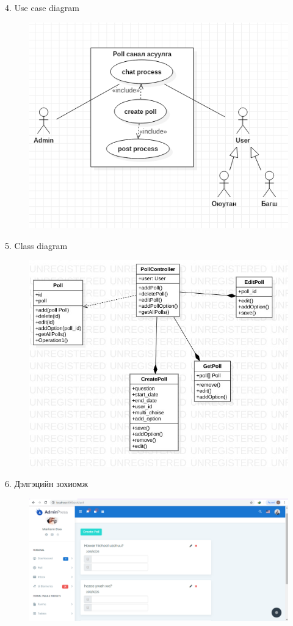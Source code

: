 \documentclass[12pt]{article}
\begin{document}
	    
	     4.      Use case diagram	
	    
   \begin{figure}
	    \centering
	    \includegraphics[width=0.7\linewidth]{./U}
	    \caption{}
	    \label{fig:U}
    \end{figure}

         5.       Class diagram
         
	 \begin{figure}
		\centering
		\includegraphics[width=0.7\linewidth]{./Main}
		\caption{}
		\label{fig:Main}
	\end{figure}


         6.      Дэлгэцийн зохиомж         

     \begin{figure}
	    \centering
	    \includegraphics[width=0.7\linewidth]{./DE}
	    \caption{}
	    \label{fig:DE}
     \end{figure}
 
\end{document}
